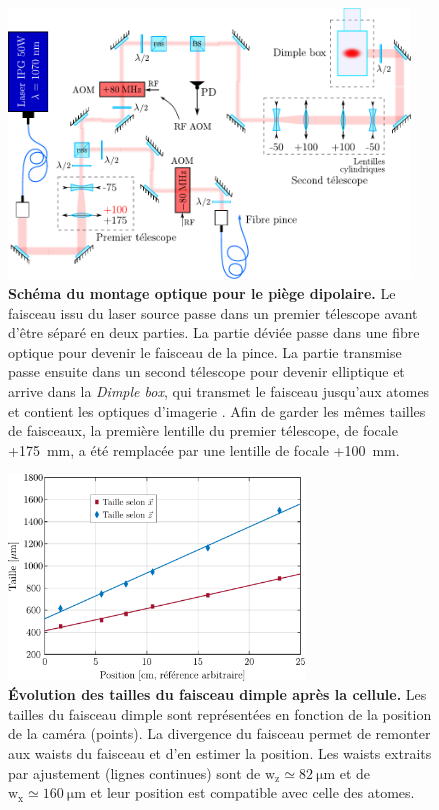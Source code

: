 \begin{figure}
\centering
\includegraphics[width=0.95\textwidth]{Fig/Modif_exp/optique_1070_new_style.pdf}
\caption{\textbf{Schéma du montage optique pour le piège dipolaire.} Le faisceau issu du laser source passe dans un premier télescope avant d'être séparé en deux parties. La partie déviée passe dans une fibre optique pour devenir le faisceau de la pince. La partie transmise passe ensuite dans un second télescope pour devenir elliptique et arrive dans la \emph{Dimple box}, qui transmet le faisceau jusqu'aux atomes et contient les optiques d'imagerie \citep{muller2015coherent}. Afin de garder les mêmes tailles de faisceaux, la première lentille du premier télescope, de focale +\SI{175}{\milli\metre}, a été remplacée par une lentille de focale +\SI{100}{\milli\metre}.}
\label{fig:optique_1070}
\end{figure}

\begin{figure}
\centering
\includegraphics[width=0.7\textwidth]{Fig/Modif_exp/expansion_dimple.pdf}
\caption{\textbf{Évolution des tailles du faisceau dimple après la cellule.} Les tailles du faisceau dimple sont représentées en fonction de la position de la caméra (points). La divergence du faisceau permet de remonter aux waists du faisceau et d'en estimer la position. Les waists extraits par ajustement (lignes continues) sont de $\mathrm{w_z}\simeq \SI{82}{\micro\metre}$ et de $\mathrm{w_x}\simeq \SI{160}{\micro\metre}$ et leur position est compatible avec celle des atomes.}
\label{fig:taille_dimple}
\end{figure}


